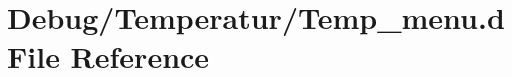 \hypertarget{_temp__menu_8d}{}\section{Debug/\+Temperatur/\+Temp\+\_\+menu.d File Reference}
\label{_temp__menu_8d}
